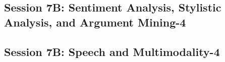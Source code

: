 \subsection{\large Session 7B: Sentiment Analysis, Stylistic Analysis, and Argument Mining-4}
\label{parallel-session-7B-trackG}
\TrackGLoc\hfill\sessionchair{}{}
\clearpage
\subsection{\large Session 7B: Speech and Multimodality-4}
\label{parallel-session-7B-trackH}
\TrackHLoc\hfill\sessionchair{}{}
\clearpage


